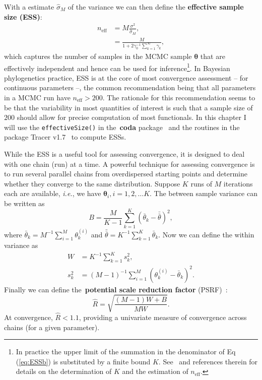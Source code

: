 With a estimate $\hat{\sigma}_M$ of the variance we can then define the \textbf{effective sample size (ESS)}:
\begin{align}
 \label{eq:ESSa}
 n_{\text{eff}} &= M\frac{\sigma^2}{\hat{\sigma}_M}, \\
  \label{eq:ESSb}
 &= \frac{M}{ 1 + 2\gamma_0^{-1}\sum_{k = 1}^\infty \gamma_k},
\end{align}
which captures the number of samples in the MCMC sample $\boldsymbol\theta$ that are effectively independent and hence can be used for inference\footnote{In practice the upper limit of the summation in the denominator of Eq (\ref{eq:ESSb}) is substituted by a finite bound $K$. See~\cite{Geyer2011} and references therein for details on the determination of $K$ and the estimation of $n_{\text{eff}}$.}.
In Bayesian phylogenetics practice, ESS is at the core of most convergence assessment -- for continuous parameters --, the common recommendation being that all parameters in a MCMC run have $n_{\text{eff}} > 200$.
The rationale for this recommendation seems to be that the variability in most quantities of interest is such that a sample size of $200$ should allow for precise computation of most functionals.
In this chapter I will use the \verb|effectiveSize()| in the~\textbf{coda} package~\citep{Plummer2006} and the routines in the package Tracer v1.7~\citep{Rambaut2018} to compute ESSs.

While the ESS is a useful tool for assessing convergence, it is designed to deal with one chain (run) at a time.
A powerful technique for assessing convergence is to run several parallel chains from overdispersed starting points and determine whether they converge to the same distribution.
Suppose $K$ runs of $M$ iterations each are available, \textit{i.e.}, we have $\boldsymbol\theta_i, i = 1, 2, \ldots K$.
The between sample variance can be written as
\begin{equation}
\label{eq:Between}
 B = \frac{M}{K-1} \sum_{k = 1}^K \left(\bar{\theta}_k - \bar{\bar{\theta}}\right)^2, 
\end{equation}
where $\bar{\theta}_k = M^{-1}\sum_{i = 1}^M\theta_k^{(i)}$ and $\bar{\bar{\theta}} = K^{-1}\sum_{k=1}^K\bar{\theta}_k$.
Now we can define the within variance as 
\begin{align}
\label{eq:Within}
 W &=  K^{-1}\sum_{k = 1}^K s_k^2,\\
 s_k^2 & = (M-1)^{-1} \sum_{i = 1}^M \left(\theta_k^{(i)} - \bar{\theta}_k\right)^2.
\end{align}
Finally we can define the~\textbf{potential scale reduction factor} (PSRF)~\citep{Gelman1992}:
\begin{equation}
 \label{eq:PRSF}
 \hat{R} = \sqrt{\frac{ (M-1)W +  B }{MW}}.
\end{equation}
At convergence, $\hat{R} < 1.1$, providing a univariate measure of convergence across chains (for a given parameter).

